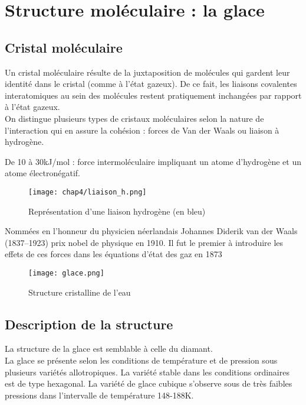 \section{Structure moléculaire : la glace}
\subsection*{Cristal moléculaire}
Un cristal moléculaire résulte de la juxtaposition de molécules
qui gardent leur identité dans le cristal (comme à l'état gazeux).
De ce fait, les liaisons covalentes interatomiques au sein des
molécules restent pratiquement inchangées par rapport à l'état
gazeux.\\
On distingue plusieurs types de cristaux moléculaires selon la
nature de l'interaction qui en assure la cohésion :
forces de Van der Waals ou liaison à hydrogène.

\begin{rem}
    De 10 à 30kJ/mol : force intermoléculaire impliquant un
    atome d'hydrogène et un atome électronégatif.
\end{rem}
\begin{figure}
    \centering
    \texttt{[image: chap4/liaison\_h.png]}
    \caption[Liaison hydrogène]{Représentation d'une liaison
        hydrogène (en bleu)}\label{fig:4_liason_h}
\end{figure}
\begin{rem}
    Nommées en l'honneur du physicien néerlandais Johannes
    Diderik van der Waals (1837\---1923) prix nobel de
    physique en 1910. Il fut le premier à introduire les
    effets de ces forces dans les équations d'état des gaz
    en 1873
\end{rem}
\begin{figure}
    \centering
    \texttt{[image: glace.png]}
    \caption{Structure cristalline de l'eau}\label{fig:4_glace}
\end{figure}

\subsection{Description de la structure}
La structure de la glace est semblable à celle du diamant.\\
La glace se présente selon les conditions de température et
de pression sous plusieurs variétés allotropiques.
La variété stable dans les conditions ordinaires est
de type hexagonal. La variété de glace cubique s’observe
sous de très faibles pressions dans l’intervalle de
température 148\--188K.


